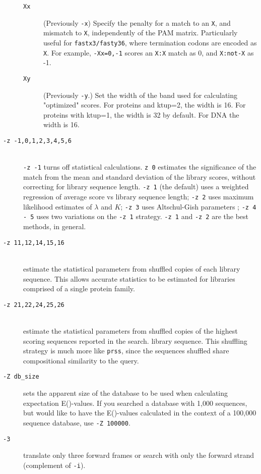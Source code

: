 \documentclass[11pt]{article}
\begin{document}
\begin{description}
\begin{description}
\item[\texttt{Xx}] (Previously \texttt{-x}) Specify the penalty for a
  match to an \texttt{X}, and mismatch to \texttt{X}, independently of
  the PAM matrix.  Particularly useful for \texttt{fastx3/fasty36},
  where termination codons are encoded as \texttt{X}.  For example,
  \texttt{-Xx=0,-1} scores an \texttt{X:X} match as 0, and
  \texttt{X:not-X} as -1.

\item[\texttt{Xy}] (Previously \texttt{-y}.) Set the width of the band
  used for calculating "optimized" scores.  For proteins and ktup=2,
  the width is 16.  For proteins with ktup=1, the width is 32 by
  default.  For DNA the width is 16.

\end{description}

\item[\texttt{-z -1,0,1,2,3,4,5,6}]\hfill\\
\texttt{-z -1} turns off statistical calculations. \texttt{z 0} estimates
the significance of the match from the mean and standard deviation of
the library scores, without correcting for library sequence length.
\texttt{-z 1} (the default) uses a weighted regression of average score
vs library sequence length; \texttt{-z 2} uses maximum likelihood
estimates of $\lambda$
and $K$; \texttt{-z 3} uses Altschul-Gish parameters \cite{alt960};
\texttt{-z 4 - 5} uses two variations on the \texttt{-z 1}
strategy. \texttt{-z 1} and \texttt{-z 2} are the best methods, in
general.
\item[\texttt{-z 11,12,14,15,16}]\hfill\\
estimate the statistical parameters from shuffled copies of each
library sequence.  This allows accurate statistics to be estimated for libraries comprised of a single protein family.

\item[\texttt{-z 21,22,24,25,26}]\hfill\\
estimate the statistical parameters from shuffled copies of the
highest scoring sequences reported in the search.
library sequence. This shuffling strategy is much more like
\texttt{prss}, since the sequences shuffled share compositional
similarity to the query.
\item[\texttt{-Z db\_size}]
sets the apparent size of the database to be used when calculating
expectation E()-values.  If you searched a database with 1,000
sequences, but would like to have the E()-values calculated in the
context of a 100,000 sequence database, use \texttt{-Z 100000}.
\item[\texttt{-3}]
translate only three forward frames or search with only the forward
strand (complement of \texttt{-i}).
\end{description}
\end{document}

